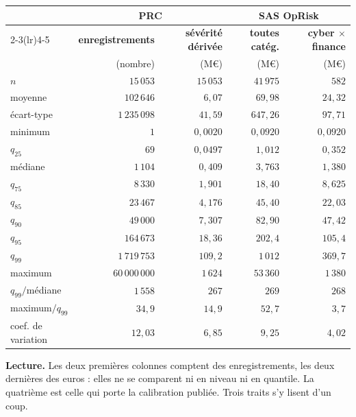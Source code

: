 \begin{center}\small
\renewcommand{\arraystretch}{1.1}
\begin{tabular}{@{}l r r r r@{}}
\toprule
& \multicolumn{2}{c}{\textbf{PRC}} & \multicolumn{2}{c}{\textbf{SAS OpRisk}} \\
\cmidrule(lr){2-3}\cmidrule(lr){4-5}
& \textbf{enregistrements} & \textbf{sévérité dérivée} & \textbf{toutes catég.} &
\textbf{cyber $\times$ finance} \\
& (nombre) & (M\euro) & (M\euro) & (M\euro) \\
\midrule
$n$              & $15\,053$     & $15\,053$   & $41\,975$  & $582$ \\
moyenne          & $102\,646$    & $6{,}07$    & $69{,}98$  & $24{,}32$ \\
écart-type       & $1\,235\,098$ & $41{,}59$   & $647{,}26$ & $97{,}71$ \\
minimum          & $1$           & $0{,}0020$  & $0{,}0920$ & $0{,}0920$ \\
\midrule
$q_{25}$         & $69$          & $0{,}0497$  & $1{,}012$  & $0{,}352$ \\
médiane          & $1\,104$      & $0{,}409$   & $3{,}763$  & $1{,}380$ \\
$q_{75}$         & $8\,330$      & $1{,}901$   & $18{,}40$  & $8{,}625$ \\
$q_{85}$         & $23\,467$     & $4{,}176$   & $45{,}40$  & $22{,}03$ \\
$q_{90}$         & $49\,000$     & $7{,}307$   & $82{,}90$  & $47{,}42$ \\
$q_{95}$         & $164\,673$    & $18{,}36$   & $202{,}4$  & $105{,}4$ \\
$q_{99}$         & $1\,719\,753$ & $109{,}2$   & $1\,012$   & $369{,}7$ \\
maximum          & $60\,000\,000$& $1\,624$    & $53\,360$  & $1\,380$ \\
\midrule
$q_{99}/$médiane & $1\,558$      & $267$       & $269$      & $268$ \\
maximum$/q_{99}$ & $34{,}9$      & $14{,}9$    & $52{,}7$   & $3{,}7$ \\
coef. de variation & $12{,}03$   & $6{,}85$    & $9{,}25$   & $4{,}02$ \\
\bottomrule
\end{tabular}
\end{center}

\vspace{2pt}
\noindent\textbf{Lecture.} Les deux premières colonnes comptent des enregistrements, les deux
dernières des euros : elles ne se comparent ni en niveau ni en quantile. La quatrième est celle
qui porte la calibration publiée. Trois traits s'y lisent d'un coup.

